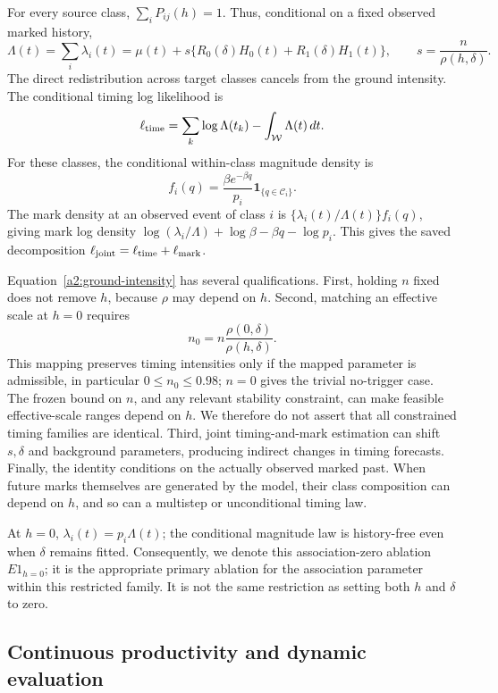 For every source class, \(\sum_iP_{ij}(h)=1\). Thus, conditional on a
fixed observed marked history,
\begin{equation}
 \Lambda(t)=\sum_i\lambda_i(t)
 =\mu(t)+s\{R_0(\delta)H_0(t)+R_1(\delta)H_1(t)\},
 \qquad s=\frac{n}{\rho(h,\delta)}.
 \label{a2:ground-intensity}
\end{equation}
The direct redistribution across target classes cancels from the ground
intensity. The conditional timing log likelihood is
\[
 \ell_{\rm time}=\sum_k\log\Lambda(t_k)-\int_{\mathcal W}\Lambda(t)\,dt.
\]
For these classes, the conditional within-class magnitude density is
\[
 f_i(q)=\frac{\beta e^{-\beta q}}{p_i}\mathbf1_{\{q\in\mathcal C_i\}}.
\]
The mark density at an observed event of class \(i\) is
\(\{\lambda_i(t)/\Lambda(t)\} f_i(q)\), giving mark log density
\(\log(\lambda_i/\Lambda)+\log\beta-\beta q-\log p_i\).
This gives the saved decomposition
\(\ell_{\rm joint}=\ell_{\rm time}+\ell_{\rm mark}\).

Equation~\eqref{a2:ground-intensity} has several qualifications.
First, holding \(n\) fixed does not remove \(h\), because \(\rho\) may
depend on \(h\). Second, matching an effective scale at \(h=0\) requires
\[
 n_0=n\frac{\rho(0,\delta)}{\rho(h,\delta)}.
\]
This mapping preserves timing intensities only if the mapped parameter is
admissible, in particular \(0\leq n_0\leq 0.98\); \(n=0\) gives the
trivial no-trigger case. The frozen bound on \(n\), and any relevant
stability constraint, can make feasible effective-scale ranges depend on
\(h\). We therefore do not assert that all constrained timing families are
identical. Third, joint timing-and-mark estimation can shift \(s,\delta\)
and background parameters, producing indirect changes in timing forecasts.
Finally, the identity conditions on the actually observed marked past.
When future marks themselves are generated by the model, their class
composition can depend on \(h\), and so can a multistep or unconditional
timing law.

At \(h=0\), \(\lambda_i(t)=p_i\Lambda(t)\); the conditional magnitude law
is history-free even when \(\delta\) remains fitted. Consequently, we denote this association-zero ablation \(E1_{h=0}\);
it is the appropriate primary ablation for the association parameter
within this restricted family. It is not the same restriction
as setting both \(h\) and \(\delta\) to zero.

\subsection{Continuous productivity and dynamic evaluation}

